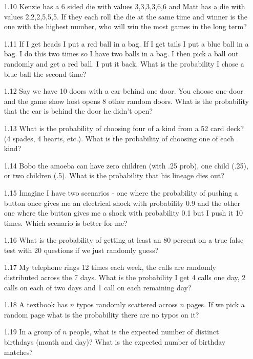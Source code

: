 \begin{enumerate}
\item[1.10]
Kenzie has a 6 sided die with values 3,3,3,3,6,6 and Matt has a die with values 2,2,2,5,5,5. If they each roll the die at the same time and winner is the one with the highest number, who will win the most games in the long term?

\item[1.11]
If I get heads I put a red ball in a bag. If I get tails I put a blue ball in a bag. I do this two times so I have two balls in a bag. I then pick a ball out randomly and get a red ball. I put it back. What is the probability I chose a blue ball the second time?

\item[1.12]
Say we have 10 doors with a car behind one door. You choose one door and the game show host opens 8 other random doors. What is the probability that the car is behind the door he didn't open?

\item[1.13]
What is the probability of choosing four of a kind from a 52 card deck? (4 spades, 4 hearts, etc.). What is the probability of choosing one of each kind?

\item[1.14]
Bobo the amoeba can have zero children (with .25 prob), one child (.25), or two children (.5). What is the probability that his lineage dies out?

\item[1.15]
Imagine I have two scenarios - one where the probability of pushing a button once gives me an electrical shock with probability 0.9 and the other one where the button gives me a shock with probability 0.1 but I push it 10 times. Which scenario is better for me?

\item[1.16]
What is the probability of getting at least an 80 percent on a true false test with 20 questions if we just randomly guess?

\item[1.17]
My telephone rings 12 times each week, the calls are randomly distributed across the 7 days. What is the probability I get 4 calls one day, 2 calls on each of two days and 1 call on each remaining day?

\item[1.18]
A textbook has $n$ typos randomly scattered across $n$ pages. If we pick a random page what is the probability there are no typos on it?

\item[1.19]
In a group of $n$ people, what is the expected number of distinct birthdays (month and day)? What is the expected number of birthday matches?


\end{enumerate}

